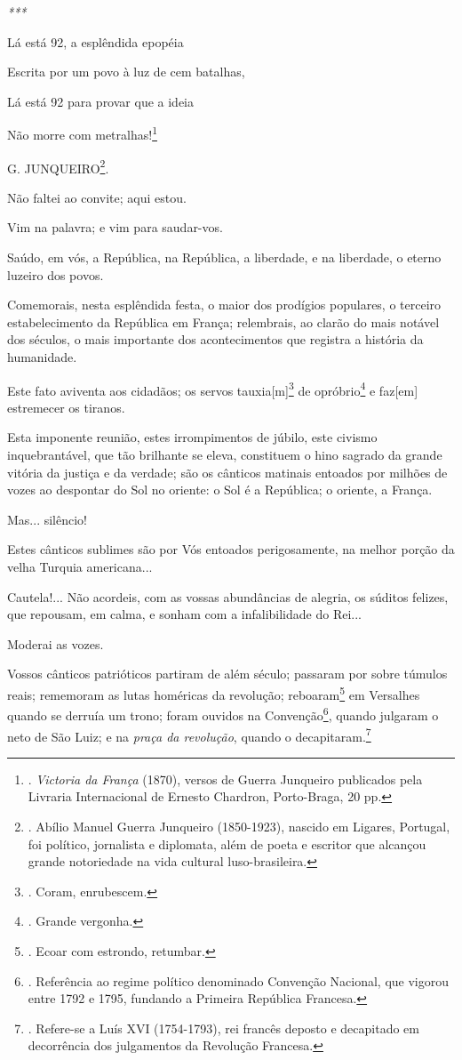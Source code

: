 \emph{***}

Lá está 92, a esplêndida epopéia

Escrita por um povo à luz de cem batalhas,

Lá está 92 para provar que a ideia

Não morre com metralhas!\footnote{. \emph{Victoria da França} (1870),
  versos de Guerra Junqueiro publicados pela Livraria Internacional de
  Ernesto Chardron, Porto-Braga, 20 pp.}

G. JUNQUEIRO\footnote{. Abílio Manuel Guerra Junqueiro (1850-1923),
  nascido em Ligares, Portugal, foi político, jornalista e diplomata,
  além de poeta e escritor que alcançou grande notoriedade na vida
  cultural luso-brasileira.}.

Não faltei ao convite; aqui estou.

Vim na palavra; e vim para saudar-vos.

Saúdo, em vós, a República, na República, a liberdade, e na liberdade, o
eterno luzeiro dos povos.

Comemorais, nesta esplêndida festa, o maior dos prodígios populares, o
terceiro estabelecimento da República em França; relembrais, ao clarão
do mais notável dos séculos, o mais importante dos acontecimentos que
registra a história da humanidade.

Este fato aviventa aos cidadãos; os servos tauxia{[}m{]}\footnote{.
  Coram, enrubescem.} de opróbrio\footnote{. Grande vergonha.} e
faz{[}em{]} estremecer os tiranos.

Esta imponente reunião, estes irrompimentos de júbilo, este civismo
inquebrantável, que tão brilhante se eleva, constituem o hino sagrado da
grande vitória da justiça e da verdade; são os cânticos matinais
entoados por milhões de vozes ao despontar do Sol no oriente: o Sol é a
República; o oriente, a França.

Mas... silêncio!

Estes cânticos sublimes são por Vós entoados perigosamente, na melhor
porção da velha Turquia americana...

Cautela!... Não acordeis, com as vossas abundâncias de alegria, os
súditos felizes, que repousam, em calma, e sonham com a infalibilidade
do Rei...

Moderai as vozes.

Vossos cânticos patrióticos partiram de além século; passaram por sobre
túmulos reais; rememoram as lutas homéricas da revolução;
reboaram\footnote{. Ecoar com estrondo, retumbar.} em Versalhes quando
se derruía um trono; foram ouvidos na Convenção\footnote{. Referência ao
  regime político denominado Convenção Nacional, que vigorou entre 1792
  e 1795, fundando a Primeira República Francesa.}, quando julgaram o
neto de São Luiz; e na \emph{praça da revolução}, quando o
decapitaram.\footnote{. Refere-se a Luís XVI (1754-1793), rei francês
  deposto e decapitado em decorrência dos julgamentos da Revolução
  Francesa.}

